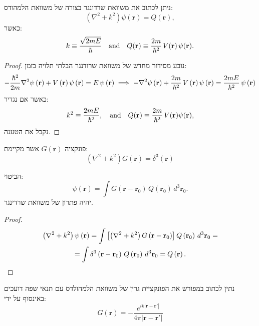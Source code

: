 \documentclass{tstextbook}
\begin{document}
\begin{proposition}
ניתן לכתוב את משוואת שרדונגר בצורה של משוואת הלמהודס:
$$\left(\nabla^{2}+k^{2}\right)\psi(\mathbf{r})=Q(\mathbf{r}),$$
כאשר:
$$k\equiv\frac{\sqrt{2m E}}{\hbar}\quad\mathrm{and}\quad Q({\bf r})\equiv\frac{2m}{\hbar^{2}}\,V({\bf r})\,\psi({\bf r}).$$

\end{proposition}
\begin{proof}
נובע מסידור מחדש של משוואת שרודנגר הבלתי תלויה בזמן:
$$-\frac{\hbar^{2}}{2m}\nabla^{2}\psi\left( \mathbf{r} \right)+V\left( \mathbf{r} \right)\psi\left( \mathbf{r} \right)=E\,\psi\left( \mathbf{r} \right)\implies-\nabla^{2}\psi\left( {\bf r} \right)+\frac{2m}{\hbar^{2}}\,V\left( {\bf r} \right)\psi\left( {\bf r} \right)=\frac{2m E}{\hbar^{2}}\,\psi\left( {\bf r} \right)$$
כאשר אם נגדיר:
$$k^{2}\equiv\frac{2m E}{\hbar^{2}},\quad\mathrm{and}\quad Q({\bf r})\equiv\frac{2m}{\hbar^{2}}\,V({\bf r})\psi({\bf r}),$$
נקבל את הטענה.

\end{proof}
\begin{reminder}
פונקציה \(G\left( \mathbf{r} \right)\) אשר מקיימת:
$$\left(\nabla^{2}+k^{2}\right)G(\mathbf{r})=\delta^{3}(\mathbf{r})$$

\end{reminder}
\begin{proposition}
הביטוי:
$$\psi(\mathbf{r})=\int G(\mathbf{r}-\mathbf{r}_{0})\,Q(\mathbf{r}_{0})\,d^{3}\mathbf{r}_{0}.$$
יהיה פתרון של משוואת שרדינגר.

\end{proposition}
\begin{proof}
$$\begin{gather}\left(\nabla^{2}+k^{2}\right)\psi\left(\mathbf{r}\right)=\int\left[\left(\nabla^{2}+k^{2}\right)G\left( \mathbf{r}-\mathbf{r}_{0} \right)\right]Q\left( \mathbf{r}_{0} \right)\,d^{3}\mathbf{r}_{0}=\\=\int\delta^{3}\left( {\bf r}-{\bf r}_{0} \right)\,Q\left( {\bf r}_{0} \right)\,d^{3}{\bf r}_{0}=Q\left( {\bf r} \right). 
\end{gather}$$

\end{proof}
\begin{proposition}
נתין לכתוב במפורש את הפונקציית גרין של משוואת הלמהולדס עם תנאי שפה דועכים באינסוף על ידי:
$$G\left( \mathbf{r} \right)=-\frac{e^{i k |\mathbf{r}-\mathbf{r}'|}}{4\pi |\mathbf{r}-\mathbf{r}'|}$$

\end{proposition}
\end{document}

